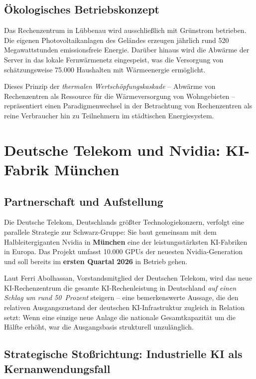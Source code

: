 \documentclass[12pt, a4paper, openany]{report}
\begin{document}
\subsection{Ökologisches Betriebskonzept}

Das Rechenzentrum in Lübbenau wird ausschließlich mit Grünstrom betrieben.
Die eigenen Photovoltaikanlagen des Geländes erzeugen jährlich rund
520 Megawattstunden emissionsfreie Energie. Darüber hinaus wird die Abwärme
der Server in das lokale Fernwärmenetz eingespeist, was die Versorgung von
schätzungsweise 75.000 Haushalten mit Wärmeenergie ermöglicht.

Dieses Prinzip der \emph{thermalen Wertschöpfungskaskade} -- Abwärme von
Rechenzentren als Ressource für die Wärmeversorgung von Wohngebieten --
repräsentiert einen Paradigmenwechsel in der Betrachtung von Rechenzentren
als reine Verbraucher hin zu Teilnehmern im städtischen Energiesystem.

\section{Deutsche Telekom und Nvidia: KI-Fabrik München}
\label{sec:telekom_nvidia}

\subsection{Partnerschaft und Aufstellung}

Die Deutsche Telekom, Deutschlands größter Technologiekonzern, verfolgt
eine parallele Strategie zur Schwarz-Gruppe: Sie baut gemeinsam mit dem
Halbleitergiganten Nvidia in \textbf{München} eine der leistungsstärksten
KI-Fabriken in Europa. Das Projekt umfasst 10.000 GPUs der neuesten
Nvidia-Generation und soll bereits im \textbf{ersten Quartal 2026} in
Betrieb gehen.

Laut Ferri Abolhassan, Vorstandsmitglied der Deutschen Telekom, wird das
neue KI-Rechenzentrum die gesamte KI-Rechenleistung in Deutschland
\emph{auf einen Schlag um rund 50~Prozent} steigern -- eine bemerkenswerte
Aussage, die den relativen Ausgangszustand der deutschen KI-Infrastruktur
zugleich in Relation setzt: Wenn eine einzige neue Anlage die nationale
Gesamtkapazität um die Hälfte erhöht, war die Ausgangsbasis strukturell
unzulänglich.

\subsection{Strategische Stoßrichtung: Industrielle KI als Kernanwendungsfall}
\end{document}
